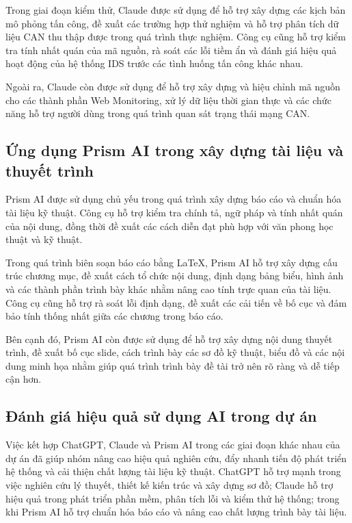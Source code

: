 Trong giai đoạn kiểm thử, Claude được sử dụng để hỗ trợ xây dựng các kịch bản mô phỏng tấn công, đề xuất các trường hợp thử nghiệm và hỗ trợ phân tích dữ liệu CAN thu thập được trong quá trình thực nghiệm. Công cụ cũng hỗ trợ kiểm tra tính nhất quán của mã nguồn, rà soát các lỗi tiềm ẩn và đánh giá hiệu quả hoạt động của hệ thống IDS trước các tình huống tấn công khác nhau.

Ngoài ra, Claude còn được sử dụng để hỗ trợ xây dựng và hiệu chỉnh mã nguồn cho các thành phần Web Monitoring, xử lý dữ liệu thời gian thực và các chức năng hỗ trợ người dùng trong quá trình quan sát trạng thái mạng CAN.

\subsection{Ứng dụng Prism AI trong xây dựng tài liệu và thuyết trình}

Prism AI được sử dụng chủ yếu trong quá trình xây dựng báo cáo và chuẩn hóa tài liệu kỹ thuật. Công cụ hỗ trợ kiểm tra chính tả, ngữ pháp và tính nhất quán của nội dung, đồng thời đề xuất các cách diễn đạt phù hợp với văn phong học thuật và kỹ thuật.

Trong quá trình biên soạn báo cáo bằng LaTeX, Prism AI hỗ trợ xây dựng cấu trúc chương mục, đề xuất cách tổ chức nội dung, định dạng bảng biểu, hình ảnh và các thành phần trình bày khác nhằm nâng cao tính trực quan của tài liệu. Công cụ cũng hỗ trợ rà soát lỗi định dạng, đề xuất các cải tiến về bố cục và đảm bảo tính thống nhất giữa các chương trong báo cáo.

Bên cạnh đó, Prism AI còn được sử dụng để hỗ trợ xây dựng nội dung thuyết trình, đề xuất bố cục slide, cách trình bày các sơ đồ kỹ thuật, biểu đồ và các nội dung minh họa nhằm giúp quá trình trình bày đề tài trở nên rõ ràng và dễ tiếp cận hơn.

\subsection{Đánh giá hiệu quả sử dụng AI trong dự án}

Việc kết hợp ChatGPT, Claude và Prism AI trong các giai đoạn khác nhau của dự án đã giúp nhóm nâng cao hiệu quả nghiên cứu, đẩy nhanh tiến độ phát triển hệ thống và cải thiện chất lượng tài liệu kỹ thuật. ChatGPT hỗ trợ mạnh trong việc nghiên cứu lý thuyết, thiết kế kiến trúc và xây dựng sơ đồ; Claude hỗ trợ hiệu quả trong phát triển phần mềm, phân tích lỗi và kiểm thử hệ thống; trong khi Prism AI hỗ trợ chuẩn hóa báo cáo và nâng cao chất lượng trình bày tài liệu.

